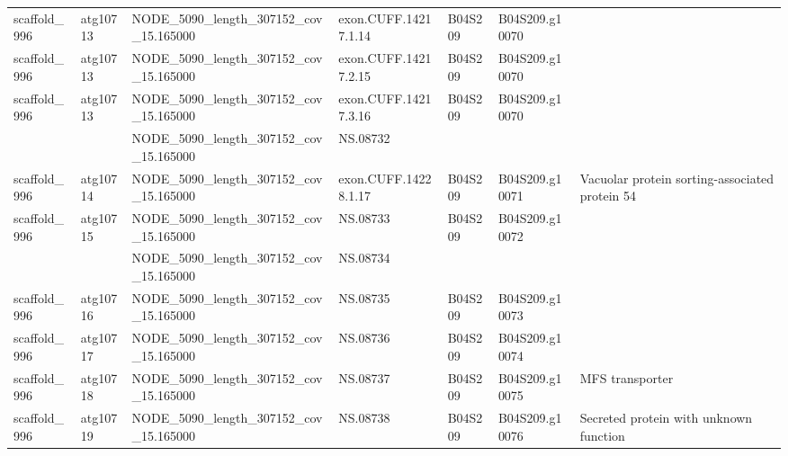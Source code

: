 \begin{longtable}{lllllll}
   scaffold\_996 &  atg10713 &   NODE\_5090\_length\_307152\_cov\_15.165000 &  exon.CUFF.14217.1.14 &      B04S209 &  B04S209.g10070 &                                                                                 \\
   scaffold\_996 &  atg10713 &   NODE\_5090\_length\_307152\_cov\_15.165000 &  exon.CUFF.14217.2.15 &      B04S209 &  B04S209.g10070 &                                                                                 \\
   scaffold\_996 &  atg10713 &   NODE\_5090\_length\_307152\_cov\_15.165000 &  exon.CUFF.14217.3.16 &      B04S209 &  B04S209.g10070 &                                                                                 \\
                &           &   NODE\_5090\_length\_307152\_cov\_15.165000 &              NS.08732 &              &                 &                                                                                 \\
   scaffold\_996 &  atg10714 &   NODE\_5090\_length\_307152\_cov\_15.165000 &  exon.CUFF.14228.1.17 &      B04S209 &  B04S209.g10071 &                                  Vacuolar protein sorting-associated protein 54 \\
   scaffold\_996 &  atg10715 &   NODE\_5090\_length\_307152\_cov\_15.165000 &              NS.08733 &      B04S209 &  B04S209.g10072 &                                                                                 \\
                &           &   NODE\_5090\_length\_307152\_cov\_15.165000 &              NS.08734 &              &                 &                                                                                 \\
   scaffold\_996 &  atg10716 &   NODE\_5090\_length\_307152\_cov\_15.165000 &              NS.08735 &      B04S209 &  B04S209.g10073 &                                                                                 \\
   scaffold\_996 &  atg10717 &   NODE\_5090\_length\_307152\_cov\_15.165000 &              NS.08736 &      B04S209 &  B04S209.g10074 &                                                                                 \\
   scaffold\_996 &  atg10718 &   NODE\_5090\_length\_307152\_cov\_15.165000 &              NS.08737 &      B04S209 &  B04S209.g10075 &                                                                 MFS transporter \\
   scaffold\_996 &  atg10719 &   NODE\_5090\_length\_307152\_cov\_15.165000 &              NS.08738 &      B04S209 &  B04S209.g10076 &                                          Secreted protein with unknown function \\

\end{longtable}
